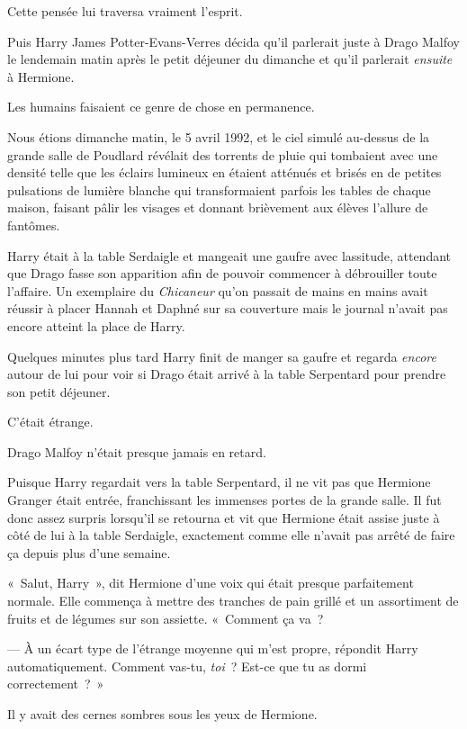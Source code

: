 Cette pensée lui traversa vraiment l'esprit.

Puis Harry James Potter-Evans-Verres décida qu'il parlerait juste à Drago Malfoy le lendemain matin après le petit déjeuner du dimanche et qu'il parlerait \emph{ensuite} à Hermione.

Les humains faisaient ce genre de chose en permanence.

\later

Nous étions dimanche matin, le 5 avril 1992, et le ciel simulé au-dessus de la grande salle de Poudlard révélait des torrents de pluie qui tombaient avec une densité telle que les éclairs lumineux en étaient atténués et brisés en de petites pulsations de lumière blanche qui transformaient parfois les tables de chaque maison, faisant pâlir les visages et donnant brièvement aux élèves l'allure de fantômes.

Harry était à la table Serdaigle et mangeait une gaufre avec lassitude, attendant que Drago fasse son apparition afin de pouvoir commencer à débrouiller toute l'affaire. Un exemplaire du \emph{Chicaneur} qu'on passait de mains en mains avait réussir à placer Hannah et Daphné sur sa couverture mais le journal n'avait pas encore atteint la place de Harry.

Quelques minutes plus tard Harry finit de manger sa gaufre et regarda \emph{encore} autour de lui pour voir si Drago était arrivé à la table Serpentard pour prendre son petit déjeuner.

C'était étrange.

Drago Malfoy n'était presque jamais en retard.

Puisque Harry regardait vers la table Serpentard, il ne vit pas que Hermione Granger était entrée, franchissant les immenses portes de la grande salle. Il fut donc assez surpris lorsqu'il se retourna et vit que Hermione était assise juste à côté de lui à la table Serdaigle, exactement comme elle n'avait pas arrêté de faire ça depuis plus d'une semaine.

«~Salut, Harry~», dit Hermione d'une voix qui était presque parfaitement normale. Elle commença à mettre des tranches de pain grillé et un assortiment de fruits et de légumes sur son assiette. «~Comment ça va~?

--- À un écart type de l'étrange moyenne qui m'est propre, répondit Harry automatiquement. Comment vas-tu, \emph{toi}~? Est-ce que tu as dormi correctement~?~»

Il y avait des cernes sombres sous les yeux de Hermione.

